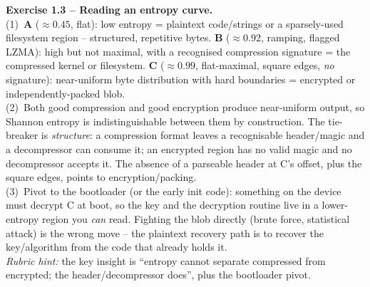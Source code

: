 \documentclass[11pt,a4paper]{article}
\begin{document}
\begin{solutionbox}
\textbf{Exercise 1.3 -- Reading an entropy curve.}\\[2pt]
(1)~\textbf{A} ($\approx0.45$, flat): low entropy = plaintext code/strings or a sparsely-used
filesystem region -- structured, repetitive bytes. \textbf{B} ($\approx0.92$, ramping, flagged
LZMA): high but not maximal, with a recognised compression signature = the compressed kernel or
filesystem. \textbf{C} ($\approx0.99$, flat-maximal, square edges, \emph{no} signature):
near-uniform byte distribution with hard boundaries = encrypted or independently-packed blob.\\[2pt]
(2)~Both good compression and good encryption produce near-uniform output, so Shannon entropy is
indistinguishable between them by construction. The tie-breaker is \emph{structure}: a
compression format leaves a recognisable header/magic and a decompressor can consume it; an
encrypted region has no valid magic and no decompressor accepts it. The absence of a parseable
header at C's offset, plus the square edges, points to encryption/packing.\\[2pt]
(3)~Pivot to the bootloader (or the early init code): something on the device must decrypt C at
boot, so the key and the decryption routine live in a lower-entropy region you \emph{can} read.
Fighting the blob directly (brute force, statistical attack) is the wrong move -- the plaintext
recovery path is to recover the key/algorithm from the code that already holds it.\\[2pt]
\emph{Rubric hint:} the key insight is ``entropy cannot separate compressed from encrypted; the
header/decompressor does'', plus the bootloader pivot.
\end{solutionbox}
\end{document}
